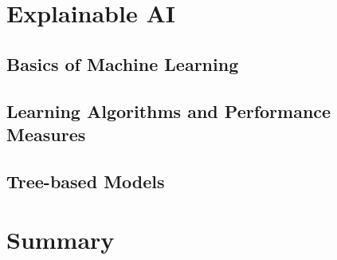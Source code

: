 \documentclass[11pt,a4paper, DIV=12]{report}
\begin{document}
    \section{Explainable AI}
        
    \label{background_explainable_ai}
        \subsection{Basics of Machine Learning}
            
        \subsection{Learning Algorithms and Performance Measures}
            \label{section_algorithms_performance_measures}
            
        \subsection{Tree-based Models}
            \label{section_tree_based_models}
            
    \section{Summary}
        
\end{document}
